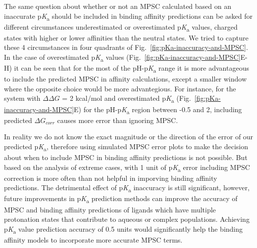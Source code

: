 \documentclass[9pt,lineno,final]{elife}
\newcommand{\pKa}{p\textit{K}\textsubscript{a}}
\begin{document}
The same question about whether or not an MPSC calculated based on an inaccurate \pKa{} should be included in binding affinity predictions can be asked for different circumstances underestimated or overestimated \pKa{} values, charged states with higher or lower affinities than the neutral states. We tried to capture these 4 circumstances in four quadrants of Fig.~\ref{fig:pKa-inaccuracy-and-MPSC}. In the case of overestimated \pKa{} values (Fig.~\ref{fig:pKa-inaccuracy-and-MPSC}E-H) it can be seen that for the most of the pH-\pKa{} range it is more advantageous to include the predicted MPSC in affinity calculations, except a smaller window where the opposite choice would be more advantegious. For instance, for the system with $\Delta\Delta G$ = 2 kcal/mol and overestimated \pKa{} (Fig.~\ref{fig:pKa-inaccuracy-and-MPSC}E) for the pH-\pKa{} region between -0.5 and 2, including predicted $\Delta G_{corr}$ causes more error than ignoring MPSC. 

In reality we do not know the exact magnitude or the direction of the error of our predicted \pKa{}, therefore using simulated MPSC error plots to make the decision about when to include MPSC in binding affinity predictions is not possible. But based on the analysis of extreme cases, with 1 unit of \pKa{} error including MPSC correction is more often than not helpful in imporving binding affinity predictions. The detrimental effect of \pKa{} inaccuracy is still significant, however, future improvements in \pKa{} prediction methods can improve the accuracy of MPSC and binding affinity predictions of ligands which have multiple protonation states that contribute to aqueous or complex populations. Achieving \pKa{} value prediction accuracy of 0.5 units would significantly help the binding affinity models to incorporate more accurate MPSC terms.   
\end{document}

